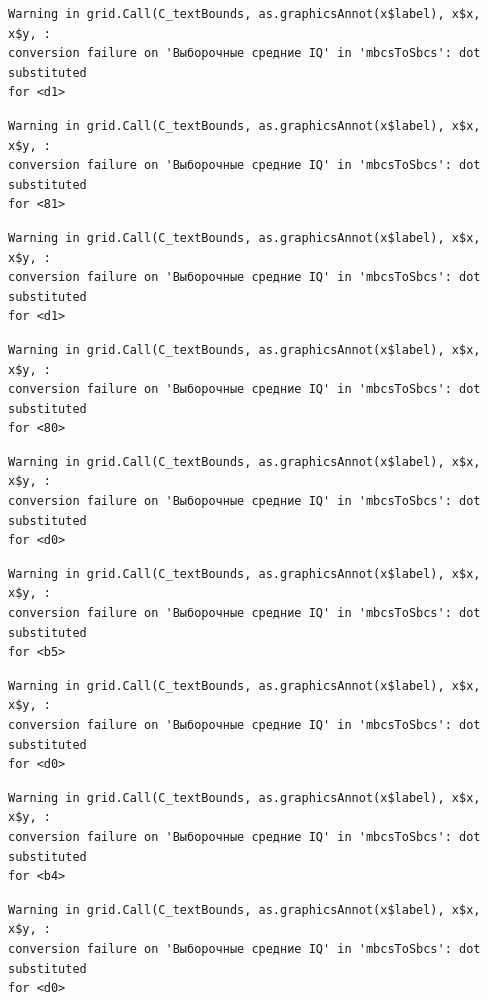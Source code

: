 \documentclass[
  letterpaper,
  DIV=11,
  numbers=noendperiod]{scrreprt}
\theoremstyle{definition}
\theoremstyle{remark}
\begin{document}
\begin{verbatim}
Warning in grid.Call(C_textBounds, as.graphicsAnnot(x$label), x$x, x$y, :
conversion failure on 'Выборочные средние IQ' in 'mbcsToSbcs': dot substituted
for <d1>
\end{verbatim}

\begin{verbatim}
Warning in grid.Call(C_textBounds, as.graphicsAnnot(x$label), x$x, x$y, :
conversion failure on 'Выборочные средние IQ' in 'mbcsToSbcs': dot substituted
for <81>
\end{verbatim}

\begin{verbatim}
Warning in grid.Call(C_textBounds, as.graphicsAnnot(x$label), x$x, x$y, :
conversion failure on 'Выборочные средние IQ' in 'mbcsToSbcs': dot substituted
for <d1>
\end{verbatim}

\begin{verbatim}
Warning in grid.Call(C_textBounds, as.graphicsAnnot(x$label), x$x, x$y, :
conversion failure on 'Выборочные средние IQ' in 'mbcsToSbcs': dot substituted
for <80>
\end{verbatim}

\begin{verbatim}
Warning in grid.Call(C_textBounds, as.graphicsAnnot(x$label), x$x, x$y, :
conversion failure on 'Выборочные средние IQ' in 'mbcsToSbcs': dot substituted
for <d0>
\end{verbatim}

\begin{verbatim}
Warning in grid.Call(C_textBounds, as.graphicsAnnot(x$label), x$x, x$y, :
conversion failure on 'Выборочные средние IQ' in 'mbcsToSbcs': dot substituted
for <b5>
\end{verbatim}

\begin{verbatim}
Warning in grid.Call(C_textBounds, as.graphicsAnnot(x$label), x$x, x$y, :
conversion failure on 'Выборочные средние IQ' in 'mbcsToSbcs': dot substituted
for <d0>
\end{verbatim}

\begin{verbatim}
Warning in grid.Call(C_textBounds, as.graphicsAnnot(x$label), x$x, x$y, :
conversion failure on 'Выборочные средние IQ' in 'mbcsToSbcs': dot substituted
for <b4>
\end{verbatim}

\begin{verbatim}
Warning in grid.Call(C_textBounds, as.graphicsAnnot(x$label), x$x, x$y, :
conversion failure on 'Выборочные средние IQ' in 'mbcsToSbcs': dot substituted
for <d0>
\end{verbatim}
\end{document}
